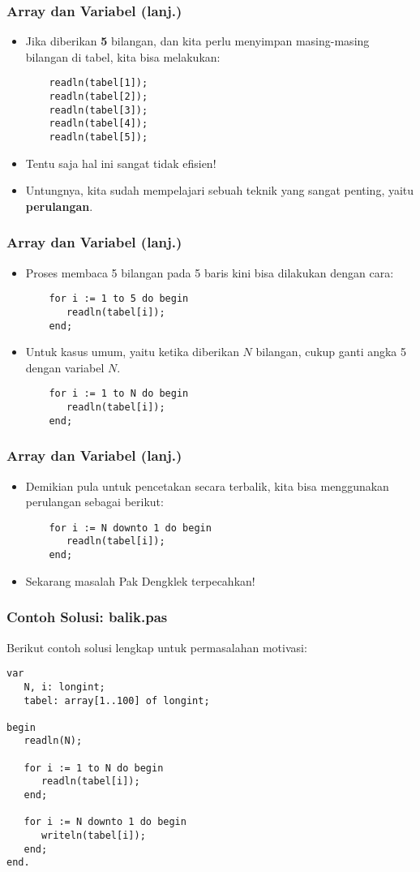 \documentclass{beamer}
\begin{document}
\begin{frame}[fragile]
\frametitle{Array dan Variabel (lanj.)}
\begin{itemize}
	\item Jika diberikan \textbf{5} bilangan, dan kita perlu menyimpan masing-masing bilangan di tabel, kita bisa melakukan:
	\begin{lstlisting}
	readln(tabel[1]);
	readln(tabel[2]);
	readln(tabel[3]);
	readln(tabel[4]);
	readln(tabel[5]);		
	\end{lstlisting}
	\item Tentu saja hal ini sangat tidak efisien!
	\item Untungnya, kita sudah mempelajari sebuah teknik yang sangat penting, yaitu \textbf{perulangan}.
\end{itemize}
\end{frame}

\begin{frame}[fragile]
\frametitle{Array dan Variabel (lanj.)}
\begin{itemize}
	\item Proses membaca 5 bilangan pada 5 baris kini bisa dilakukan dengan cara:
	\begin{lstlisting}
	for i := 1 to 5 do begin
	   readln(tabel[i]);
	end;
	\end{lstlisting}
	\item Untuk kasus umum, yaitu ketika diberikan $N$ bilangan, cukup ganti angka 5 dengan variabel $N$.
	\begin{lstlisting}
	for i := 1 to N do begin
	   readln(tabel[i]);
	end;
	\end{lstlisting}
\end{itemize}
\end{frame}

\begin{frame}[fragile]
\frametitle{Array dan Variabel (lanj.)}
\begin{itemize}
	\item Demikian pula untuk pencetakan secara terbalik, kita bisa menggunakan perulangan sebagai berikut:
	\begin{lstlisting}
	for i := N downto 1 do begin
	   readln(tabel[i]);
	end;
	\end{lstlisting}
	\item Sekarang masalah Pak Dengklek terpecahkan!
\end{itemize}
\end{frame}

\begin{frame}[fragile]
\frametitle{Contoh Solusi: balik.pas}
Berikut contoh solusi lengkap untuk permasalahan motivasi:
\begin{lstlisting}
var
   N, i: longint;
   tabel: array[1..100] of longint;

begin
   readln(N);

   for i := 1 to N do begin
      readln(tabel[i]);
   end;

   for i := N downto 1 do begin
      writeln(tabel[i]);
   end;
end.
\end{lstlisting}
\end{frame}
\end{document}
